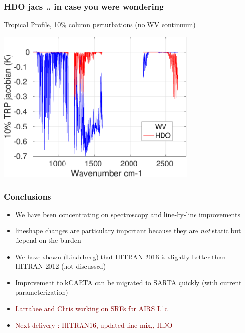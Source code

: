 \documentclass[10pt,t]{beamer}
\begin{document}
\begin{frame}
  \frametitle{HDO jacs .. in case you were wondering}
  Tropical Profile, 10\% column perturbations (no WV continuum)
   \begin{center}
     \noindent\includegraphics[width=0.75\textwidth]{Figs/hdojac.pdf}
   \end{center}  
\end{frame}

\begin{frame}
  \frametitle{Conclusions}
  \begin{itemize}
  \item We have been concentrating on spectroscopy and line-by-line
    improvements
  \item \cd lineshape changes are particulary important because they are
    \emph{not} static but depend on the \water burden.
  \item We have shown (Lindeberg) that HITRAN 2016 \water is slightly
    better than HITRAN 2012 (not discussed)
  \item Improvement to kCARTA can be migrated to SARTA quickly (with
    current parameterization)
  \item \textcolor{maroon}{Larrabee and Chris working on SRFs for AIRS L1c}
  \item \textcolor{maroon}{Next delivery : HITRAN16, updated \cd line-mix,\amm, HDO}
  \end{itemize}
\end{frame}


\end{document}
